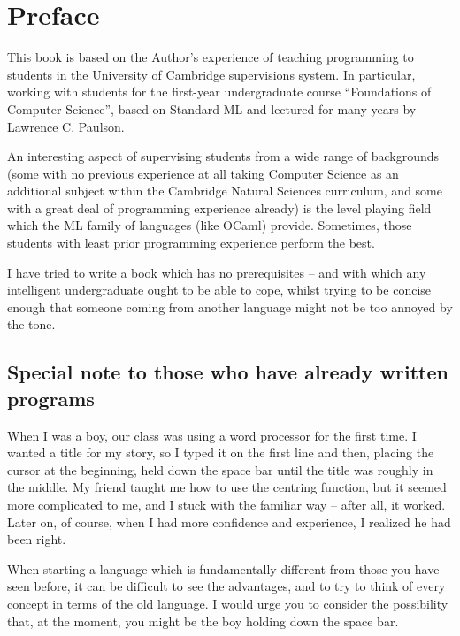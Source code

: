 \documentclass[]{book}
\begin{document}
\cleardoublepage

\clearpage
\small\pagestyle{empty}{\normalfont\tableofcontents}

\chapter*{Preface}

This book is based on the Author's experience of teaching programming to students in the University of Cambridge supervisions system. In particular, working with students for the first-year undergraduate course ``Foundations of Computer Science'', based on Standard ML and lectured for many years by Lawrence C. Paulson.

An interesting aspect of supervising students from a wide range of backgrounds (some with no previous experience at all taking Computer Science as an additional subject within the Cambridge Natural Sciences curriculum, and some with a great deal of programming experience already) is the level playing field which the ML family of languages (like OCaml) provide. Sometimes, those students with least prior programming experience perform the best.

I have tried to write a book which has no prerequisites -- and with which any intelligent undergraduate ought to be able to cope, whilst trying to be concise enough that someone coming from another language might not be too annoyed by the tone.

\section*{Special note to those who have already written programs}
When I was a boy, our class was using a word processor for the first time. I wanted a title for my story, so I typed it on the first line and then, placing the cursor at the beginning, held down the space bar until the title was roughly in the middle. My friend taught me how to use the centring function, but it seemed more complicated to me, and I stuck with the familiar way -- after all, it worked. Later on, of course, when I had more confidence and experience, I realized he had been right.

When starting a language which is fundamentally different from those you have seen before, it can be difficult to see the advantages, and to try to think of every concept in terms of the old language. I would urge you to consider the possibility that, at the moment, you might be the boy holding down the space bar.
\end{document}

